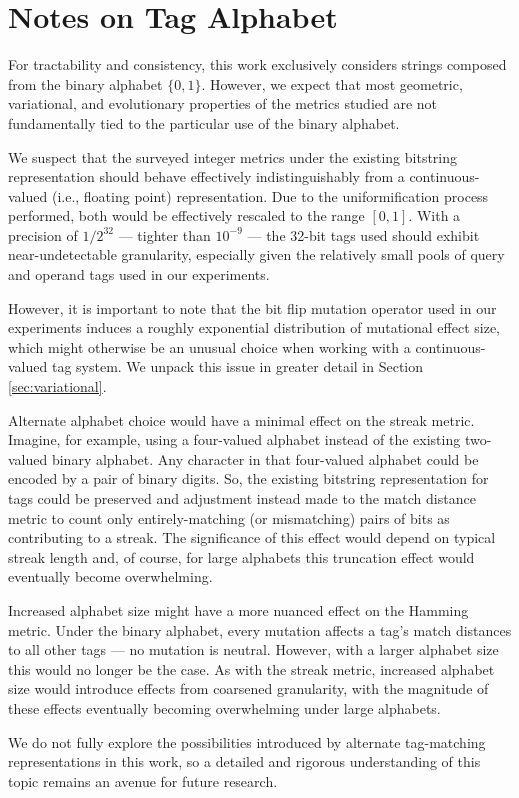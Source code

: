 \section{Notes on Tag Alphabet} \label{sec:alphabet}

For tractability and consistency, this work exclusively considers strings composed from the binary alphabet $\{0, 1\}$.
However, we expect that most geometric, variational, and evolutionary properties of the metrics studied are not fundamentally tied to the particular use of the binary alphabet.

We suspect that the surveyed integer metrics under the existing bitstring representation should behave effectively indistinguishably from a continuous-valued (i.e., floating point) representation.
Due to the uniformification process performed, both would be effectively rescaled to the range $[0, 1]$.
With a precision of $1/2^{32}$ --- tighter than $10^{-9}$ --- the 32-bit tags used should exhibit near-undetectable granularity, especially given the relatively small pools of query and operand tags used in our experiments.

However, it is important to note that the bit flip mutation operator used in our experiments induces a roughly exponential distribution of mutational effect size, which might otherwise be an unusual choice when working with a continuous-valued tag system.
We unpack this issue in greater detail in Section \ref{sec:variational}.

Alternate alphabet choice would have a minimal effect on the streak metric.
Imagine, for example, using a four-valued alphabet instead of the existing two-valued binary alphabet.
Any character in that four-valued alphabet could be encoded by a pair of binary digits.
So, the existing bitstring representation for tags could be preserved and adjustment instead made to the match distance metric to count only entirely-matching (or mismatching) pairs of bits as contributing to a streak.
The significance of this effect would depend on typical streak length and, of course, for large alphabets this truncation effect would eventually become overwhelming.

Increased alphabet size might have a more nuanced effect on the Hamming metric.
Under the binary alphabet, every mutation affects a tag's match distances to all other tags --- no mutation is neutral.
However, with a larger alphabet size this would no longer be the case.
As with the streak metric, increased alphabet size would introduce effects from coarsened granularity, with the magnitude of these effects eventually becoming overwhelming under large alphabets.

We do not fully explore the possibilities introduced by alternate tag-matching representations in this work, so a detailed and rigorous understanding of this topic remains an avenue for future research.
